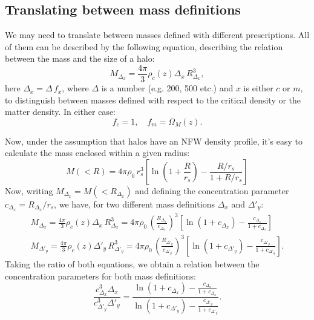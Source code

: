 \documentclass{article}
\begin{document}
\subsection{Translating between mass definitions}
We may need to translate between masses defined with different prescriptions. All of them can be described by the following equation, describing the relation between the mass and the size of a halo:
\begin{equation}
  M_{\Delta_x}=\frac{4\pi}{3}\rho_c(z)\Delta_x\,R_{\Delta_x}^3,
\end{equation}
here $\Delta_x=\Delta\,f_x$, where $\Delta$ is a number (e.g. 200, 500 etc.) and $x$ is either $c$ or $m$, to distinguish between masses defined with respect to the critical density or the matter density. In either case:
\begin{equation}
  f_c=1,\hspace{12pt} f_m=\Omega_M(z).
\end{equation}

Now, under the assumption that halos have an NFW density profile, it's easy to calculate the mass enclosed within a given radius:
\begin{equation}
  M(<R)=4\pi\rho_0\,r_s^3\left[\ln\left(1+\frac{R}{r_s}\right)-\frac{R/r_s}{1+R/r_s}\right]
\end{equation}
Now, writing $M_{\Delta_x}=M(<R_{\Delta_x})$ and defining the concentration parameter $c_{\Delta_x}=R_{\Delta_x}/r_s$, we have, for two different mass definitions $\Delta_x$ and $\Delta'_y$:
\begin{align}
  M_{\Delta_x}=\frac{4\pi}{3}\rho_c(z)\Delta_x\,R_{\Delta_x}^3=4\pi\rho_0\,\left(\frac{R_{\Delta_x}}{c_{\Delta_x}}\right)^3\left[\ln\left(1+c_{\Delta_x}\right)-\frac{c_{\Delta_x}}{1+c_{\Delta_x}}\right]\\
  M_{\Delta'_y}=\frac{4\pi}{3}\rho_c(z)\Delta'_y\,R_{\Delta'_y}^3=4\pi\rho_0\,\left(\frac{R_{\Delta'_y}}{c_{\Delta'_y}}\right)^3\left[\ln\left(1+c_{\Delta'_y}\right)-\frac{c_{\Delta'_y}}{1+c_{\Delta'_y}}\right].
\end{align}
Taking the ratio of both equations, we obtain a relation between the concentration parameters for both mass definitions:
\begin{equation}
  \frac{c_{\Delta_x}^3\Delta_x}{c_{\Delta'_y}^3\Delta'_y}=\frac{\ln\left(1+c_{\Delta_x}\right)-\frac{c_{\Delta_x}}{1+c_{\Delta_x}}}{\ln\left(1+c_{\Delta'_y}\right)-\frac{c_{\Delta'_y}}{1+c_{\Delta'_y}}}.
\end{equation}
\end{document}

